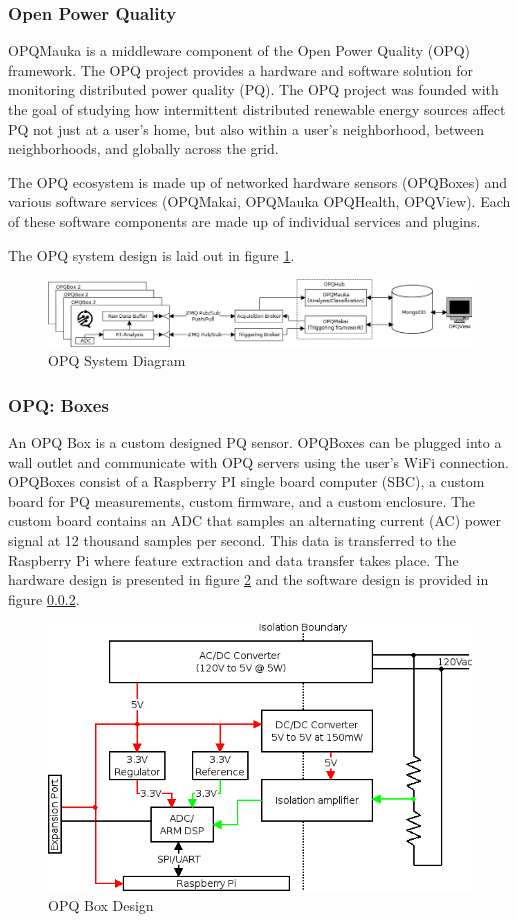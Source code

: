 \subsubsection{Open Power Quality}
OPQMauka is a middleware component of the Open Power Quality (OPQ) framework. The OPQ project provides a hardware and software solution for monitoring distributed power quality (PQ). The OPQ project was founded with the goal of studying how intermittent distributed renewable energy sources affect PQ not just at a user's home, but also within a user's neighborhood, between neighborhoods, and globally across the grid. 

The OPQ ecosystem is made up of networked hardware sensors (OPQBoxes) and various software services (OPQMakai, OPQMauka OPQHealth, OPQView). Each of these software components are made up of individual services and plugins.

The OPQ system design is laid out in figure \ref{fig:opq-system}.

\begin{figure}
	\centering
	\includegraphics[width=\linewidth]{figures/system-diagram.png}
	\caption{OPQ System Diagram}\label{fig:opq-system}
\end{figure}

\subsubsection{OPQ: Boxes}
An OPQ Box is a custom designed PQ sensor. OPQBoxes can be plugged into a wall outlet and communicate with OPQ servers using the user's WiFi connection. OPQBoxes consist of a Raspberry PI single board computer (SBC), a custom board for PQ measurements, custom firmware, and a custom enclosure. The custom board contains an ADC that samples an alternating current (AC) power signal at 12 thousand samples per second. This data is transferred to the Raspberry Pi where feature extraction and data transfer takes place. The hardware design is presented in figure \ref{fig:opq-box-design} and the software design is provided in figure \ref{}.

\begin{figure}
	\centering
	\includegraphics[width=.75\linewidth]{figures/opqbox_diagram.png}
	\caption{OPQ Box Design}\label{fig:opq-box-design}
\end{figure}

